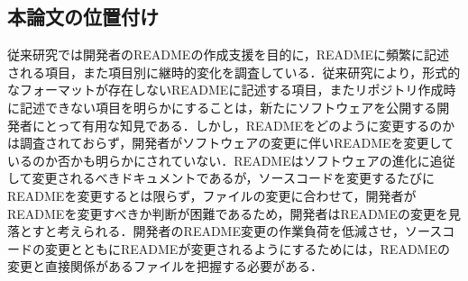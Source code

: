 \documentclass[submit]{ipsj}
\begin{document}





\subsection{本論文の位置付け}



従来研究\cite{prana_README}\cite{Ikeda_README}\cite{Kamei_README}では開発者のREADMEの作成支援を目的に，READMEに頻繁に記述される項目，また項目別に継時的変化を調査している．従来研究により，形式的なフォーマットが存在しないREADMEに記述する項目，またリポジトリ作成時に記述できない項目を明らかにすることは，新たにソフトウェアを公開する開発者にとって有用な知見である．しかし，READMEをどのように変更するのかは調査されておらず，開発者がソフトウェアの変更に伴いREADMEを変更しているのか否かも明らかにされていない．READMEはソフトウェアの進化に追従して変更されるべきドキュメントであるが，ソースコードを変更するたびにREADMEを変更するとは限らず，ファイルの変更に合わせて，開発者がREADMEを変更すべきか判断が困難であるため，開発者はREADMEの変更を見落とすと考えられる．開発者のREADME変更の作業負荷を低減させ，ソースコードの変更とともにREADMEが変更されるようにするためには，READMEの変更と直接関係があるファイルを把握する必要がある．
\end{document}
